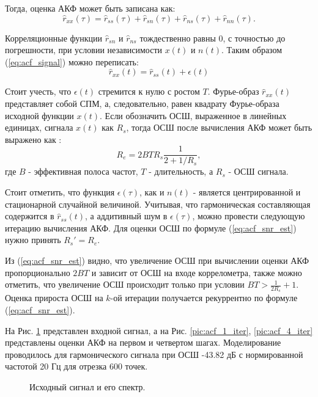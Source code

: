 Тогда, оценка АКФ может быть записана как:
\begin{equation}
	\label{eq:acf_rss_signal_full}
	\hat{r}_{xx}(\tau)=\hat{r}_{ss}(\tau)+\hat{r}_{sn}(\tau)+\hat{r}_{ns}(\tau) + \hat{r}_{nn}(\tau).
\end{equation}

Корреляционные функции ${\hat{r}_{sn}}$ и ${\hat{r}_{ns}}$ тождественно равны 0, с точностью до погрешности, при условии независимости
${x(t)}$ и ${n(t)}$. Таким образом (\ref{eq:acf_signal}) можно переписать:
\begin{equation}
	\label{eq:acf_rss_signal_new}
	\hat{r}_{xx}(t) = \hat{r}_{ss}(t) + \epsilon (t)
\end{equation}

Стоит учесть, что ${\epsilon (t)}$ стремится к нулю с ростом ${T}$. Фурье-образ ${\hat{r}_{xx}(t)}$
представляет собой СПМ, а, следовательно, равен квадрату Фурье-образа исходной функции ${x(t)}$.
Если обозначить ОСШ, выраженное в линейных единицах, сигнала ${x(t)}$ как ${R_s}$, тогда ОСШ после вычисления АКФ может быть выражено 
как \cite{book_max}:
\begin{equation}
	\label{eq:acf_snr_est}
	R_e=2BTR_s \frac{1}{2+1/R_s},
\end{equation}
где ${B}$ - эффективная полоса частот, ${T}$ - длительность, а ${R_s}$ - ОСШ сигнала.

Стоит отметить, что функция ${\epsilon(\tau)}$, как и ${n(t)}$ - является центрированной и
стационарной случайной величиной.
Учитывая, что гармоническая составляющая содержится в ${\hat{r}_{ss}(t)}$, а аддитивный шум в ${\epsilon(\tau)}$, можно провести
следующую итерацию вычисления АКФ. Для оценки ОСШ по формуле (\ref{eq:acf_snr_est}) нужно принять ${R_s' = R_e}$.

Из (\ref{eq:acf_snr_est}) видно, что увеличение ОСШ при вычислении оценки АКФ пропорционально ${2BT}$ и зависит от
ОСШ на входе коррелометра, также можно отметить, что увеличение ОСШ происходит только при условии ${BT > \frac{1}{2R_s} + 1}$.
Оценка прироста ОСШ на ${k}$-ой итерации получается рекуррентно по формуле (\ref{eq:acf_snr_est}).

На Рис. \ref{pic:acf_0_iter} представлен входной сигнал, а на
Рис. \ref{pic:acf_1_iter}, \ref{pic:acf_4_iter} представлены оценки АКФ на первом и четвертом шагах.
Моделирование проводилось для гармонического сигнала при ОСШ -43.82 дБ с нормированной частотой 20 Гц для
отрезка 600 точек.

\begin{figure}[h]
	\center{}
	\caption{Исходный сигнал и его спектр.}
	\label{pic:acf_0_iter}
\end{figure}

